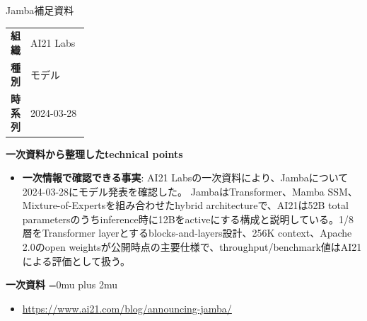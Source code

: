 \Needspace{0.38\textheight}
\begin{technicalnote}{Jamba}{補足資料}
\begingroup
\begin{tabularx}{\linewidth}{@{}>{\bfseries}p{0.22\linewidth}X@{}}
組織 & AI21 Labs \\
種別 & モデル \\
時系列 & 2024-03-28 \\
\end{tabularx}
\smallskip
{\bfseries 一次資料から整理したtechnical points}
\begin{itemize}[leftmargin=1.5em,itemsep=0.35em]
\item \textbf{一次情報で確認できる事実}: AI21 Labsの一次資料により、Jambaについて2024-03-28にモデル発表を確認した。 JambaはTransformer、Mamba SSM、Mixture-of-Expertsを組み合わせたhybrid architectureで、AI21は52B total parametersのうちinference時に12Bをactiveにする構成と説明している。1/8層をTransformer layerとするblocks-and-layers設計、256K context、Apache 2.0のopen weightsが公開時点の主要仕様で、throughput/benchmark値はAI21による評価として扱う。
\end{itemize}
\begin{minipage}{\linewidth}
\begin{samepage}
{\bfseries 一次資料}
\begingroup\sloppy
\Urlmuskip=0mu plus 2mu\relax
\begin{itemize}[leftmargin=1.5em,itemsep=0.25em]
\item {\scriptsize\url{https://www.ai21.com/blog/announcing-jamba/}}
\end{itemize}
\endgroup
\end{samepage}
\end{minipage}
\endgroup
\end{technicalnote}
\medskip

